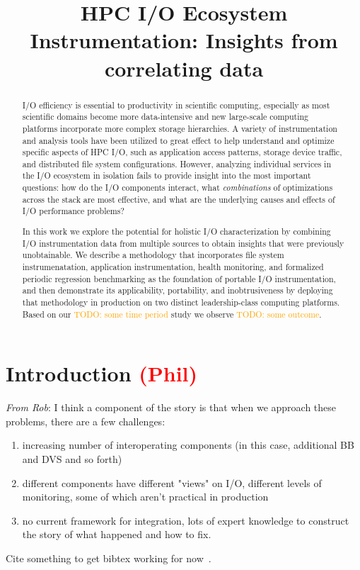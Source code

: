\documentclass[conference,10pt,compsocconf]{IEEEtran}
\newcommand{\assign}[1]{\textcolor{red}{(#1)}}
\newcommand{\todo}[1]{\textcolor{Orange}{TODO: #1}}
\begin{document}
\title{HPC I/O Ecosystem Instrumentation: Insights from correlating data}

\maketitle

\begin{abstract}

I/O efficiency is essential to productivity in scientific computing,
especially as most scientific domains become more data-intensive and
new large-scale computing platforms incorporate more complex storage
hierarchies.  A variety of instrumentation and analysis tools have been
utilized to great effect to help understand and optimize specific aspects of
HPC I/O, such as application access patterns, storage device traffic, and
distributed file system configurations.  However, analyzing individual services in the
I/O ecosystem in isolation fails to provide insight into the most important
questions: how do the I/O components interact, what \emph{combinations}
of optimizations across the stack are most effective, and what are the
underlying causes and effects of I/O performance problems?

In this work we explore the potential for holistic I/O characterization
by combining I/O instrumentation data from multiple sources to obtain
insights that were previously unobtainable. We describe a methodology that
incorporates file system instrumenatation, application instrumentation,
health monitoring, and formalized periodic regression benchmarking as
the foundation of portable I/O instrumentation, and then demonstrate
its applicability, portability, and inobtrusiveness by deploying that
methodology in production on two distinct leadership-class computing
platforms. Based on our \todo{some time period} study we observe
\todo{some outcome}.

\end{abstract}

\section{Introduction \assign{Phil}}

\emph{From Rob}: I think a component of the story is that when we approach these problems, there are a few challenges:
\begin{enumerate}
\item increasing number of interoperating components (in this case, additional
BB and DVS and so forth)
\item different components have different "views" on I/O, different levels of
monitoring, some of which aren't practical in production
\item no current framework for integration, lots of expert knowledge to
construct the story of what happened and how to fix.
\end{enumerate}
Cite something to get bibtex working for now~\cite{carns200924}.
\end{document}
